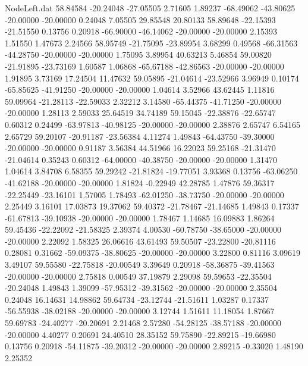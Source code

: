 \begin{filecontents}{NodeLeft.dat}
  58.84584  -20.24048  -27.05505     2.71605    1.89237  -68.49062  -43.80625  -20.00000  -20.00000    0.24048    7.05505   29.85548   20.80133
  58.89648  -22.15393  -21.51550     0.13756    0.20918  -66.90000  -46.14062  -20.00000  -20.00000    2.15393    1.51550    1.47673    2.24566
  58.95749  -21.75095  -23.89954     3.68299    0.49568  -66.31563  -44.28750  -20.00000  -20.00000    1.75095    3.89954   40.63213    5.46854
  59.00820  -21.91895  -23.73169     1.60587    1.06868  -65.67188  -42.86563  -20.00000  -20.00000    1.91895    3.73169   17.24504   11.47632
  59.05895  -21.04614  -23.52966     3.96949    0.10174  -65.85625  -41.91250  -20.00000  -20.00000    1.04614    3.52966   43.62445    1.11816
  59.09964  -21.28113  -22.59033     2.32212    3.14580  -65.44375  -41.71250  -20.00000  -20.00000    1.28113    2.59033   25.64519   34.74189
  59.15045  -22.38876  -22.65747     0.60312    0.24499  -63.97813  -40.98125  -20.00000  -20.00000    2.38876    2.65747    6.54165    2.65729
  59.20107  -20.91187  -23.56384     4.11274    1.49843  -64.43750  -39.30000  -20.00000  -20.00000    0.91187    3.56384   44.51966   16.22023
  59.25168  -21.31470  -21.04614     0.35243    0.60312  -64.00000  -40.38750  -20.00000  -20.00000    1.31470    1.04614    3.84708    6.58355
  59.29242  -21.81824  -19.77051     3.93368    0.13756  -63.06250  -41.62188  -20.00000  -20.00000    1.81824   -0.22949   42.28785    1.47876
  59.36317  -22.25449  -23.16101     1.57005    1.78493  -62.01250  -38.73750  -20.00000  -20.00000    2.25449    3.16101   17.03873   19.37062
  59.40372  -21.78467  -21.14685     1.49843    0.17337  -61.67813  -39.10938  -20.00000  -20.00000    1.78467    1.14685   16.09883    1.86264
  59.45436  -22.22092  -21.58325     2.39374    4.00530  -60.78750  -38.65000  -20.00000  -20.00000    2.22092    1.58325   26.06616   43.61493
  59.50507  -23.22800  -20.81116     0.28081    0.31662  -59.09375  -38.80625  -20.00000  -20.00000    3.22800    0.81116    3.09619    3.49107
  59.55580  -22.75818  -20.00549     3.39649    0.20918  -58.36875  -39.41563  -20.00000  -20.00000    2.75818    0.00549   37.19879    2.29098
  59.59653  -22.35504  -20.24048     1.49843    1.39099  -57.95312  -39.31562  -20.00000  -20.00000    2.35504    0.24048   16.14631   14.98862
  59.64734  -23.12744  -21.51611     1.03287    0.17337  -56.55938  -38.02188  -20.00000  -20.00000    3.12744    1.51611   11.18054    1.87667
  59.69783  -24.40277  -20.20691     2.21468    2.57280  -54.28125  -38.57188  -20.00000  -20.00000    4.40277    0.20691   24.40510   28.35152
  59.75890  -22.89215  -19.66980     0.13756    0.20918  -54.11875  -39.20312  -20.00000  -20.00000    2.89215   -0.33020    1.48190    2.25352

\end{filecontents}
